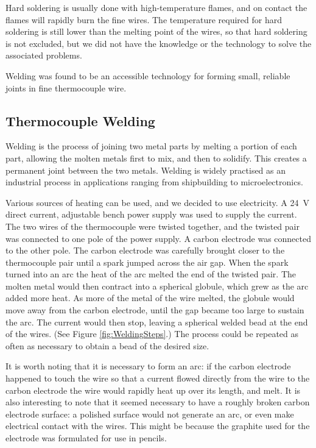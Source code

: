 Hard soldering is usually done with high-temperature flames, and on contact the
flames will rapidly burn the fine wires. The temperature required for hard
soldering is still lower than the melting point of the wires, so that hard
soldering is not excluded, but we did not have the knowledge or the technology
to solve the associated problems.

Welding was found to be an accessible technology for forming small, reliable
joints in fine thermocouple wire.

\subsection{Thermocouple Welding}

Welding is the process of joining two metal parts by melting a portion of each
part, allowing the molten metals first to mix, and then to solidify. This
creates a permanent joint between the two metals. Welding is widely practised as
an industrial process in applications ranging from shipbuilding to
microelectronics.

Various sources of heating can be used, and we decided to use electricity. A
\SI{24}{\volt} direct current, adjustable bench power supply was used to supply
the current. The two wires of the thermocouple were twisted together, and the
twisted pair was connected to one pole of the power supply. A carbon electrode
was connected to the other pole. The carbon electrode was carefully brought
closer to the thermocouple pair until a spark jumped across the air gap. When
the spark turned into an arc the heat of the arc melted the end of the twisted
pair. The molten metal would then contract into a spherical globule, which grew
as the arc added more heat. As more of the metal of the wire melted, the globule
would move away from the carbon electrode, until the gap became too large to
sustain the arc. The current would then stop, leaving a spherical welded bead at
the end of the wires. (See Figure \ref{fig:WeldingSteps}.) The process could be
repeated as often as necessary to obtain a bead of the desired size.

It is worth noting that it is necessary to form an arc: if the carbon
electrode happened to touch the wire so that a current flowed directly from the
wire to the carbon electrode the wire would rapidly heat up over its length, and
melt. It is also interesting to note that it seemed necessary to have a roughly
broken carbon electrode surface: a polished surface would not generate an arc,
or even make electrical contact with the wires. This might be because the
graphite used for the electrode was formulated for use in pencils.

